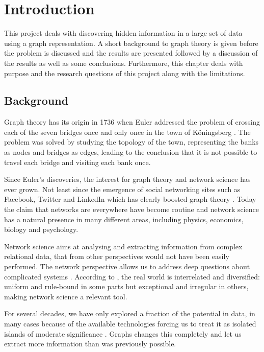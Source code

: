 \chapter{Introduction}
This project deals with discovering hidden information in a large set of data using a graph representation. A short background to graph theory is given before the problem is discussed and the results are presented followed by a discussion of the results as well as some conclusions. Furthermore, this chapter deals with purpose and the research questions of this project along with the limitations. 

\section{Background}
Graph theory has its origin in 1736 when Euler addressed the problem of crossing each of the seven bridges once and only once in the town of Köningsberg \cite{fouss2016algorithms}. The problem was solved by studying the topology of the town, representing the banks as nodes and bridges as edges, leading to the conclusion that it is not possible to travel each bridge and visiting each bank once.

Since Euler's discoveries, the interest for graph theory and network science has ever grown. Not least since the emergence of social networking sites such as Facebook, Twitter and LinkedIn which has clearly boosted graph theory \cite{fouss2016algorithms,barabasi2016network}. Today the claim that networks are everywhere have become routine \cite{brandes2013} and network science has a natural presence in many different areas, including physics, economics, biology and psychology.

Network science aims at analysing and extracting information from complex relational data, that from other perspectives would not have been easily performed. The network perspective allows us to address deep questions about complicated systems \cite{brandes2013}. According to \citet{robinson2013}, the real world is interrelated and diversified: uniform and rule-bound in some parts but exceptional and irregular in others, making network science a relevant tool.

For several decades, we have only explored a fraction of the potential in data, in many cases because of the available technologies forcing us to treat it as isolated islands of moderate significance \cite{robinson2013}. Graphs changes this completely and let us extract more information than was previously possible.

